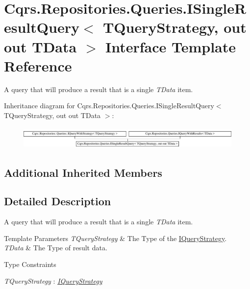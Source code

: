 \hypertarget{interfaceCqrs_1_1Repositories_1_1Queries_1_1ISingleResultQuery}{}\section{Cqrs.\+Repositories.\+Queries.\+I\+Single\+Result\+Query$<$ T\+Query\+Strategy, out out T\+Data $>$ Interface Template Reference}
\label{interfaceCqrs_1_1Repositories_1_1Queries_1_1ISingleResultQuery}


A query that will produce a result that is a single {\itshape T\+Data}  item.  


Inheritance diagram for Cqrs.\+Repositories.\+Queries.\+I\+Single\+Result\+Query$<$ T\+Query\+Strategy, out out T\+Data $>$\+:\begin{figure}[H]
\begin{center}
\leavevmode
\includegraphics[height=1.166667cm]{interfaceCqrs_1_1Repositories_1_1Queries_1_1ISingleResultQuery}
\end{center}
\end{figure}
\subsection*{Additional Inherited Members}


\subsection{Detailed Description}
A query that will produce a result that is a single {\itshape T\+Data}  item. 


\begin{DoxyTemplParams}{Template Parameters}
{\em T\+Query\+Strategy} & The Type of the \hyperlink{interfaceCqrs_1_1Repositories_1_1Queries_1_1IQueryStrategy}{I\+Query\+Strategy}.\\
\hline
{\em T\+Data} & The Type of result data.\\
\hline
\end{DoxyTemplParams}
\begin{Desc}
\item[Type Constraints]\begin{description}
\item[{\em T\+Query\+Strategy} : {\em \hyperlink{interfaceCqrs_1_1Repositories_1_1Queries_1_1IQueryStrategy}{I\+Query\+Strategy}}]\end{description}
\end{Desc}

